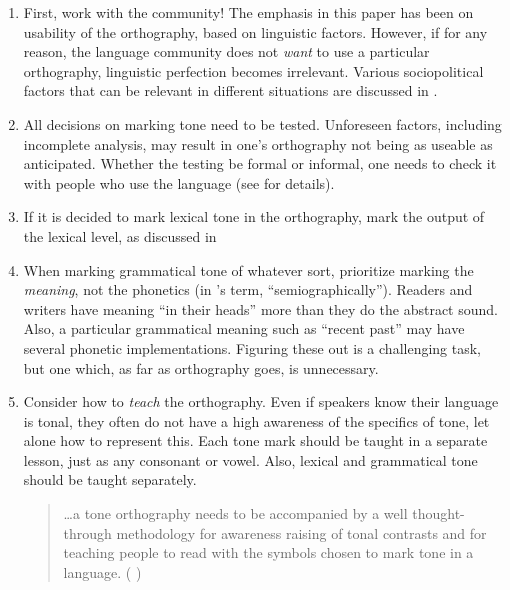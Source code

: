 \documentclass[output=paper]{langscibook}
\begin{document}
\begin{enumerate}
\item First, work with the community! The emphasis in this paper has been on usability of the orthography, based on linguistic factors. However, if for any reason, the language community does not \textit{want} to use a particular orthography, linguistic perfection becomes irrelevant. Various sociopolitical factors that can be relevant in different situations are discussed in \citet{Cahill2014}.

\item All decisions on marking tone need to be tested. Unforeseen factors, including incomplete analysis, may result in one’s orthography not being as useable as anticipated. Whether the testing be formal or informal, one needs to check it with people who use the language (see \citealt{Karan2014} for details).

\item If it is decided to mark lexical tone in the orthography, mark the output of the lexical level, as discussed in  
\item When marking grammatical tone of whatever sort, prioritize marking the \textit{meaning}, not the phonetics (in \citealt{Roberts2013}’s term, “semiographically”). Readers and writers have meaning “in their heads” more than they do the abstract sound. Also, a particular grammatical meaning such as “recent past” may have several phonetic implementations. Figuring these out is a challenging task, but one which, as far as orthography goes, is unnecessary.
\item Consider how to \textit{teach} the orthography. Even if speakers know their language is tonal, they often do not have a high awareness of the specifics of tone, let alone how to represent this. Each tone mark should be taught in a separate lesson, just as any consonant or vowel. Also, lexical and grammatical tone should be taught separately. 


\begin{quote}
\ldots a tone orthography needs to be accompanied by a well thought-through methodology for awareness raising of tonal contrasts and for teaching people to read with the symbols chosen to mark tone in a language. ( \citealt[52]{Kutsch2014})
\end{quote}


\end{enumerate}
\end{document}
